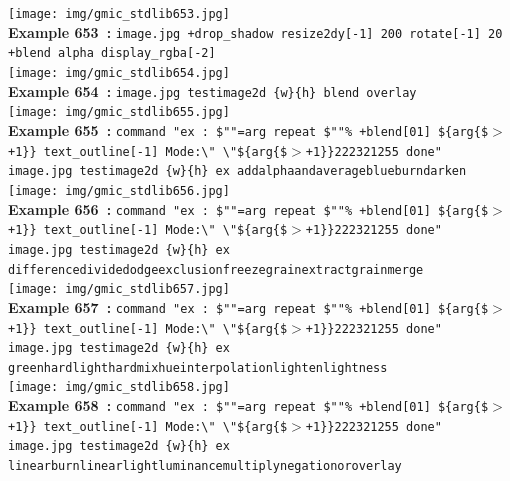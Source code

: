 \documentclass[a4paper,10.5pt,twoside]{book}
\def\comma{\discretionary{,}{}{,}}
\begin{document}
\begin{center}\texttt{[image: img/gmic\_stdlib653.jpg]}\\
{\footnotesize \textbf{Example 653~:} \texttt{image.jpg +drop\_shadow {\comma} resize2dy[-1] 200 rotate[-1] 20 +blend alpha display\_rgba[-2]}}
\\\texttt{[image: img/gmic\_stdlib654.jpg]}\\
{\footnotesize \textbf{Example 654~:} \texttt{image.jpg testimage2d \{w\}{\comma}\{h\} blend overlay}}
\\\texttt{[image: img/gmic\_stdlib655.jpg]}\\
{\footnotesize \textbf{Example 655~:} \texttt{command "ex : \$""=arg repeat \$""\% +blend[0{\comma}1] \$\{arg\{\$$>$+1\}\} text\_outline[-1] Mode:\textbackslash " \textbackslash "\$\{arg\{\$$>$+1\}\}{\comma}2{\comma}2{\comma}23{\comma}2{\comma}1{\comma}255 done" image.jpg testimage2d \{w\}{\comma}\{h\} ex add{\comma}alpha{\comma}and{\comma}average{\comma}blue{\comma}burn{\comma}darken}}
\\\texttt{[image: img/gmic\_stdlib656.jpg]}\\
{\footnotesize \textbf{Example 656~:} \texttt{command "ex : \$""=arg repeat \$""\% +blend[0{\comma}1] \$\{arg\{\$$>$+1\}\} text\_outline[-1] Mode:\textbackslash " \textbackslash "\$\{arg\{\$$>$+1\}\}{\comma}2{\comma}2{\comma}23{\comma}2{\comma}1{\comma}255 done" image.jpg testimage2d \{w\}{\comma}\{h\} ex difference{\comma}divide{\comma}dodge{\comma}exclusion{\comma}freeze{\comma}grainextract{\comma}grainmerge}}
\\\texttt{[image: img/gmic\_stdlib657.jpg]}\\
{\footnotesize \textbf{Example 657~:} \texttt{command "ex : \$""=arg repeat \$""\% +blend[0{\comma}1] \$\{arg\{\$$>$+1\}\} text\_outline[-1] Mode:\textbackslash " \textbackslash "\$\{arg\{\$$>$+1\}\}{\comma}2{\comma}2{\comma}23{\comma}2{\comma}1{\comma}255 done" image.jpg testimage2d \{w\}{\comma}\{h\} ex green{\comma}hardlight{\comma}hardmix{\comma}hue{\comma}interpolation{\comma}lighten{\comma}lightness}}
\\\texttt{[image: img/gmic\_stdlib658.jpg]}\\
{\footnotesize \textbf{Example 658~:} \texttt{command "ex : \$""=arg repeat \$""\% +blend[0{\comma}1] \$\{arg\{\$$>$+1\}\} text\_outline[-1] Mode:\textbackslash " \textbackslash "\$\{arg\{\$$>$+1\}\}{\comma}2{\comma}2{\comma}23{\comma}2{\comma}1{\comma}255 done" image.jpg testimage2d \{w\}{\comma}\{h\} ex linearburn{\comma}linearlight{\comma}luminance{\comma}multiply{\comma}negation{\comma}or{\comma}overlay}}

\end{center}
\end{document}

